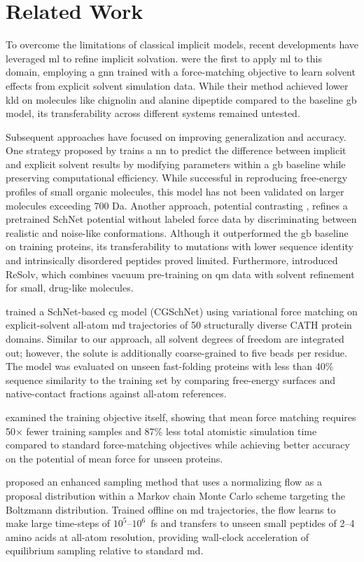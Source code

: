 \section{Related Work}
\label{sec:related_work}


To overcome the limitations of classical implicit models, recent developments have leveraged \gls{ml} to refine implicit solvation. \citet{machine_learning_implicit_solvation} were the first to apply \gls{ml} to this domain, employing a \gls{gnn} trained with a force-matching objective to learn solvent effects from explicit solvent simulation data. While their method achieved lower \gls{kld} on molecules like chignolin and alanine dipeptide compared to the baseline \gls{gb} model, its transferability across different systems remained untested.

Subsequent approaches have focused on improving generalization and accuracy. One strategy proposed by \cite{katzberger2024general, katzberger2025rapid} trains a \gls{nn} to predict the difference between implicit and explicit solvent results by modifying parameters within a \gls{gb} baseline while preserving computational efficiency. While successful in reproducing free-energy profiles of small organic molecules, this model has not been validated on larger molecules exceeding 700 Da. Another approach, potential contrasting \cite{Airas2023}, refines a pretrained SchNet potential without labeled force data by discriminating between realistic and noise-like conformations. Although it outperformed the \gls{gb} baseline on training proteins, its transferability to mutations with lower sequence identity and intrinsically disordered peptides proved limited. Furthermore, \citet{röcken2025predictingsolvationfreeenergies} introduced ReSolv, which combines vacuum pre-training on \gls{qm} data with solvent refinement for small, drug-like molecules.

\citet{charron2025navigating} trained a SchNet-based \gls{cg} model (CGSchNet) using variational force matching on explicit-solvent all-atom \gls{md} trajectories of 50 structurally diverse CATH protein domains. Similar to our approach, all solvent degrees of freedom are integrated out; however, the solute is additionally coarse-grained to five beads per residue. The model was evaluated on unseen fast-folding proteins with less than 40\% sequence similarity to the training set by comparing free-energy surfaces and native-contact fractions against all-atom references.


\citet{park2026scaling} examined the training objective itself, showing that mean force matching requires 50$\times$ fewer training samples and 87\% less total atomistic simulation time compared to standard force-matching objectives while achieving better accuracy on the potential of mean force for unseen proteins. 

\citet{klein2023timewarp} proposed an enhanced sampling method that uses a normalizing flow as a proposal distribution within a Markov chain Monte Carlo scheme targeting the Boltzmann distribution. Trained offline on \gls{md} trajectories, the flow learns to make large time-steps of $10^5$--$10^6$~fs and transfers to unseen small peptides of 2--4 amino acids at all-atom resolution, providing wall-clock acceleration of equilibrium sampling relative to standard \gls{md}.
